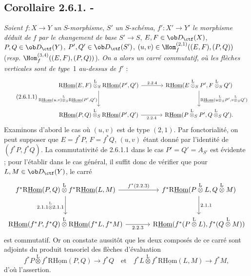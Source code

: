 \subsection*{Corollaire 2.6.1. -}
\emph{Soient} $f:X\to Y$ \emph{un} $S$-\emph{morphisme}, $S'$ \emph{un} $S$-\emph{schéma}, $f':X'\to Y'$ \emph{le morphisme déduit de} $f$ \emph{par le changement de base} $S'\to S$, $E,F\in\ob D_{\ctf}(X)$, $P,Q\in\ob D_{\ctf}(Y)$, $P',Q'\in\ob D_{\ctf}(S')$, $(u,v)\in\Hom_f^{(2,1)}((E,F),(P,Q))$ (\emph{resp}. $\Hom_f^{(3,4)}((E,F),(P,Q))$). \emph{On a alors un carré commutatif}, \emph{où les flèches verticales sont de type}~1 \emph{au-dessus de} $f'$ :
\begin{equation}\tag{2.6.1.1}
\begin{tikzcd}[column sep=large,row sep=large]
\mathrm{R}\underline{\mathrm{Hom}}(E,F)\overset{\mathrm{L}}{\otimes}_S\mathrm{R}\underline{\mathrm{Hom}}(P',Q') \arrow[r,"2.2.4"] \arrow[d,"{\mathrm{R}\underline{\mathrm{Hom}}(u,v)\overset{\mathrm{L}}{\otimes}_S\mathrm{R}\underline{\mathrm{Hom}}(P',Q')}"'] & \mathrm{R}\underline{\mathrm{Hom}}(E\overset{\mathrm{L}}{\otimes}_SP',F\overset{\mathrm{L}}{\otimes}_SQ') \arrow[d,"{\mathrm{R}\underline{\mathrm{Hom}}(u\overset{\mathrm{L}}{\otimes}_SP',v\overset{\mathrm{L}}{\otimes}_SQ')}"]\\
\mathrm{R}\underline{\mathrm{Hom}}(P,Q)\overset{\mathrm{L}}{\otimes}_S\mathrm{R}\underline{\mathrm{Hom}}(P',Q') \arrow[r,"2.2.4"'] & \mathrm{R}\underline{\mathrm{Hom}}(P\overset{\mathrm{L}}{\otimes}_SP',Q\overset{\mathrm{L}}{\otimes}_SQ').
\end{tikzcd}
\end{equation}
Examinons d'abord le cas où $(u,v)$ est de type $(2,1)$. Par fonctorialité, on peut supposer que $E=f^{*}P$, $F=f^{*}Q$, $(u,v)$ étant donné par l'identité de $(f^{*}P,f^{*}Q)$. La commutativité de 2.6.1.1 dans le cas $P'=Q'=A_{S'}$ est évidente ; pour l'établir dans le cas général, il suffit donc de vérifier que pour $L,M\in\ob D_{\ctf}(Y)$, le carré
\[
\begin{tikzcd}[column sep=large,row sep=large]
f^{*}\mathrm{R}\underline{\mathrm{Hom}}(P,Q)\overset{\mathrm{L}}{\otimes} f^{*}\mathrm{R}\underline{\mathrm{Hom}}(L,M) \arrow[r,"{f^*(2.2.3)}"] \arrow[d,"{2.1.1\overset{\mathrm{L}}{\otimes} 2.1.1}"'] & f^{*}\mathrm{R}\underline{\mathrm{Hom}}(P\overset{\mathrm{L}}{\otimes}L,Q\overset{\mathrm{L}}{\otimes}M) \arrow[d,"2.1.1"]\\
\mathrm{R}\underline{\mathrm{Hom}}(f^{*}P,f^{*}Q)\overset{\mathrm{L}}{\otimes}\mathrm{R}\underline{\mathrm{Hom}}(f^{*}L,f^{*}M) \arrow[r,"2.2.3"'] & \mathrm{R}\underline{\mathrm{Hom}}(f^{*}(P\overset{\mathrm{L}}{\otimes}L),f^{*}(Q\overset{\mathrm{L}}{\otimes}M))
\end{tikzcd}
\]
est commutatif. Or on constate aussitôt que les deux composés de ce carré sont adjoints du produit tensoriel des flèches d'évaluation
\[
f^{*}P\overset{\mathrm{L}}{\otimes} f^{*}\mathrm{R}\underline{\mathrm{Hom}}(P,Q)\longrightarrow f^{*}Q
\quad\text{et}\quad
f^{*}L\overset{\mathrm{L}}{\otimes} f^{*}\mathrm{R}\underline{\mathrm{Hom}}(L,M)\longrightarrow f^{*}M,
\]
d'où l'assertion.

